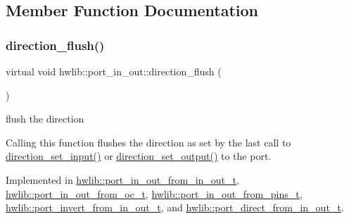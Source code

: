 \subsection{Member Function Documentation}
\mbox{\label{classhwlib_1_1port__in__out_a431b79eee48a21a93978bfdf6620f800}} 
\subsubsection{\texorpdfstring{direction\+\_\+flush()}{direction\_flush()}}
{\footnotesize\ttfamily virtual void hwlib\+::port\+\_\+in\+\_\+out\+::direction\+\_\+flush (\begin{DoxyParamCaption}{ }\end{DoxyParamCaption})\hspace{0.3cm}{\ttfamily [pure virtual]}}

flush the direction

Calling this function flushes the direction as set by the last call to \hyperlink{classhwlib_1_1port__in__out_ac7a9611410ddb9fd5d8e2dd15bff0a3f}{direction\+\_\+set\+\_\+input()} or \hyperlink{classhwlib_1_1port__in__out_a515b4a6bbde4f2df5bb11cda41234fe4}{direction\+\_\+set\+\_\+output()} to the port. 

Implemented in \hyperlink{classhwlib_1_1port__in__out__from__in__out__t_a4bf6d967ceda394a0de3d23fc9895072}{hwlib\+::port\+\_\+in\+\_\+out\+\_\+from\+\_\+in\+\_\+out\+\_\+t}, \hyperlink{classhwlib_1_1port__in__out__from__oc__t_aa8d8a3394669a8899d4e02f678722c3f}{hwlib\+::port\+\_\+in\+\_\+out\+\_\+from\+\_\+oc\+\_\+t}, \hyperlink{classhwlib_1_1port__in__out__from__pins__t_afe4c9b2ae4b70627cb11ab296211b7f3}{hwlib\+::port\+\_\+in\+\_\+out\+\_\+from\+\_\+pins\+\_\+t}, \hyperlink{classhwlib_1_1port__invert__from__in__out__t_a85f7917e1b70d8eb637aede9040d2d00}{hwlib\+::port\+\_\+invert\+\_\+from\+\_\+in\+\_\+out\+\_\+t}, and \hyperlink{classhwlib_1_1port__direct__from__in__out__t_a399d11ab7b3d583162c6bcaa584d2deb}{hwlib\+::port\+\_\+direct\+\_\+from\+\_\+in\+\_\+out\+\_\+t}.

\mbox{\label{classhwlib_1_1port__in__out_ac7a9611410ddb9fd5d8e2dd15bff0a3f}} 
